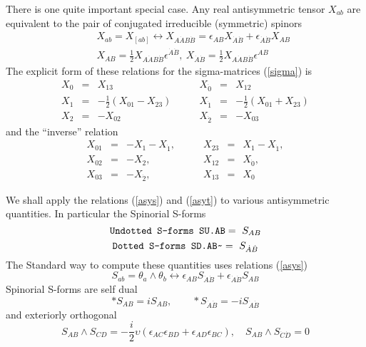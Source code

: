 \documentclass[twoside,openright]{report}
\newcommand{\grgtt}{\ttfamily}
\newcommand{\object}[2]{%
\begin{equation}
\mbox{\comm{#1}} =\ #2
\end{equation}}
\newcommand{\tsst}{\longleftrightarrow}
\renewcommand{\tt}{\grgtt}
\newcommand{\cc}{{\tt \char'176}}           %
\newcommand{\comm}[1]{{\upshape\tt#1}}    %
\begin{document}
There is one quite important special case. Any real
antisymmetric tensor $X_{ab}$ are equivalent to the
pair of conjugated irreducible (symmetric) spinors
\begin{eqnarray}
&& X_{ab}=X_{[ab]} \tsst X_{A\dot AB\dot B}=
\epsilon_{AB} X_{\dot A\dot B} + \epsilon_{\dot A\dot B}X_{AB}
\nonumber\\[1mm]
&& X_{AB}=\frac{1}{2}X_{A\dot AB\dot B}\epsilon^{\dot A\dot B},\
   X_{\dot A\dot B}=\frac{1}{2}X_{A\dot AB\dot B}\epsilon^{AB}
\end{eqnarray}
The explicit form of these relations for the sigma-matrices
(\ref{sigma}) is
\begin{equation}
\begin{array}{rclrcl}
X_0 &=& X_{13} & X_{\dot0} &=& X_{12} \\[1mm]
X_1 &=&-\frac{1}{2}(X_{01}-X_{23})\qquad  & X_{\dot1} &=&
-\frac{1}{2}(X_{01}+X_{23})  \\[1mm]
X_2 &=& -X_{02} & X_{\dot2} &=& -X_{03}
\end{array}\label{asys}
\end{equation}
and  the ``inverse'' relation
\begin{equation}
\begin{array}{rclrcl}
X_{01} &=&  -X_1-X_{\dot1},\qquad  &  X_{23} &=& X_1-X_{\dot1},  \\[1mm]
X_{02} &=& -X_2,             &  X_{12} &=& X_{\dot0},  \\[1mm]
X_{03} &=& -X_{\dot 2},      &  X_{13} &=& X_0
\end{array}\label{asyt}
\end{equation}

We shall apply the relations (\ref{asys}) and (\ref{asyt}) to various
antisymmetric quantities. In particular the {\tt Spinorial S-forms}
\object{Undotted S-forms SU.AB}{S_{AB}}
\object{Dotted S-forms SD.AB\cc}{S_{\dot A\dot B}}
The {\tt Standard way} to compute these quantities uses
relations (\ref{asys})
\begin{equation}
 S_{ab}=\theta_a\wedge\theta_b \tsst
\epsilon_{AB} S_{\dot A\dot B} + \epsilon_{\dot A\dot B}S_{AB}
\end{equation}
Spinorial S-forms are self dual
\begin{equation}
*S_{AB}=iS_{AB},\qquad
*S_{\dot A\dot B}=-iS_{\dot A\dot B}
\end{equation}
and exteriorly orthogonal
\begin{equation}
S_{AB}\wedge S_{CD}=-\frac{i}2\upsilon(\epsilon_{AC}\epsilon_{BD}+
\epsilon_{AD}\epsilon_{BC}),\quad S_{AB}\wedge S_{\dot C\dot D}=0
\end{equation}
\end{document}
